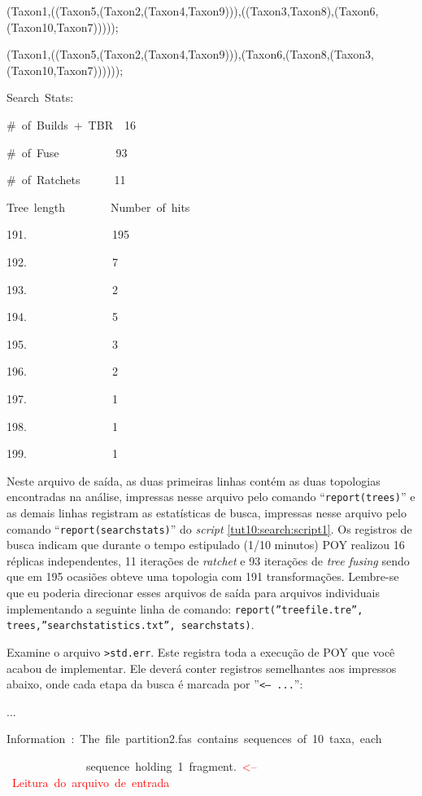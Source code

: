 \begin{refsection}
\scriptsize

(Taxon1,((Taxon5,(Taxon2,(Taxon4,Taxon9))),((Taxon3,Taxon8),(Taxon6,(Taxon10,Taxon7)))));

(Taxon1,((Taxon5,(Taxon2,(Taxon4,Taxon9))),(Taxon6,(Taxon8,(Taxon3,(Taxon10,Taxon7))))));

Search~Stats:

\#~of~Builds~+~TBR~~16

\#~of~Fuse~~~~~~~~~~93

\#~of~Ratchets~~~~~~11

Tree~length~~~~~~~~Number~of~hits

191.~~~~~~~~~~~~~~~195

192.~~~~~~~~~~~~~~~7

193.~~~~~~~~~~~~~~~2

194.~~~~~~~~~~~~~~~5

195.~~~~~~~~~~~~~~~3

196.~~~~~~~~~~~~~~~2

197.~~~~~~~~~~~~~~~1

198.~~~~~~~~~~~~~~~1

199.~~~~~~~~~~~~~~~1

\normalsize

Neste arquivo de saída, as duas primeiras linhas contém as duas topologias encontradas na análise, impressas nesse arquivo pelo comando ``\texttt{report(trees)}'' e as demais linhas registram as estatísticas de busca, impressas nesse arquivo pelo comando ``\texttt{report(searchstats)}'' do \textit{script} \ref{tut10:search:script1}. Os registros de busca indicam que durante o tempo estipulado (1/10 minutos) POY realizou 16 réplicas independentes, 11 iterações de \textit{ratchet} e 93 iterações de \textit{tree fusing} sendo que em 195 ocasiões obteve uma topologia com 191 transformações. Lembre-se que eu poderia direcionar esses arquivos de saída para arquivos individuais implementando a seguinte linha de comando: \texttt{report(''treefile.tre'', trees,''searchstatistics.txt'', searchstats)}.

Examine o arquivo \texttt{>std.err}. Este registra toda a execução de POY que você acabou de implementar. Ele deverá conter registros semelhantes aos impressos abaixo, onde cada etapa da busca é marcada por ''\texttt{<-- ...}'':

\scriptsize

...

Information~:~The~file~partition2.fas~contains~sequences~of~10~taxa,~each

~~~~~~~~~~~~~~sequence~holding~1~fragment.~\textcolor{red}{<--~Leitura~do~arquivo~de~entrada}


\end{refsection}
